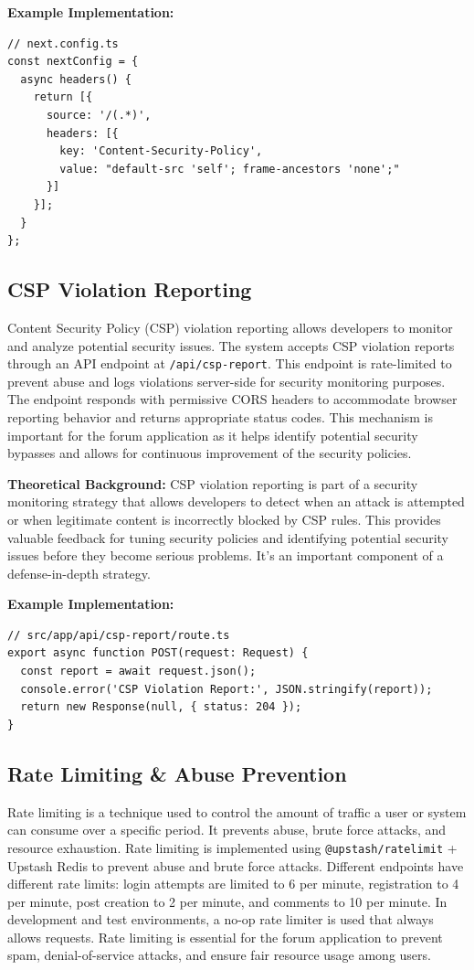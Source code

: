 \textbf{Example Implementation:}
\begin{verbatim}
// next.config.ts
const nextConfig = {
  async headers() {
    return [{
      source: '/(.*)',
      headers: [{
        key: 'Content-Security-Policy',
        value: "default-src 'self'; frame-ancestors 'none';"
      }]
    }];
  }
};
\end{verbatim}

\subsection{CSP Violation Reporting}

Content Security Policy (CSP) violation reporting allows developers to monitor and analyze potential security issues. The system accepts CSP violation reports through an API endpoint at \texttt{/api/csp-report}. This endpoint is rate-limited to prevent abuse and logs violations server-side for security monitoring purposes. The endpoint responds with permissive CORS headers to accommodate browser reporting behavior and returns appropriate status codes. This mechanism is important for the forum application as it helps identify potential security bypasses and allows for continuous improvement of the security policies.

\textbf{Theoretical Background:} CSP violation reporting is part of a security monitoring strategy that allows developers to detect when an attack is attempted or when legitimate content is incorrectly blocked by CSP rules. This provides valuable feedback for tuning security policies and identifying potential security issues before they become serious problems. It's an important component of a defense-in-depth strategy.

\textbf{Example Implementation:}
\begin{verbatim}
// src/app/api/csp-report/route.ts
export async function POST(request: Request) {
  const report = await request.json();
  console.error('CSP Violation Report:', JSON.stringify(report));
  return new Response(null, { status: 204 });
}
\end{verbatim}

\subsection{Rate Limiting \& Abuse Prevention}

Rate limiting is a technique used to control the amount of traffic a user or system can consume over a specific period. It prevents abuse, brute force attacks, and resource exhaustion. Rate limiting is implemented using \texttt{@upstash/ratelimit} + Upstash Redis to prevent abuse and brute force attacks. Different endpoints have different rate limits: login attempts are limited to 6 per minute, registration to 4 per minute, post creation to 2 per minute, and comments to 10 per minute. In development and test environments, a no-op rate limiter is used that always allows requests. Rate limiting is essential for the forum application to prevent spam, denial-of-service attacks, and ensure fair resource usage among users.

